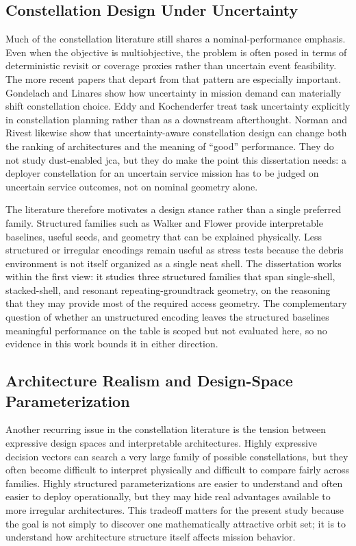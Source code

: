 \subsection{Constellation Design Under Uncertainty}
Much of the constellation literature still shares a nominal-performance emphasis. Even when the objective is multiobjective, the problem is often posed in terms of deterministic revisit or coverage proxies rather than uncertain event feasibility. The more recent papers that depart from that pattern are especially important. Gondelach and Linares \cite{GondelachLinares2019} show how uncertainty in mission demand can materially shift constellation choice. Eddy and Kochenderfer \cite{EddyKochenderfer2019} treat task uncertainty explicitly in constellation planning rather than as a downstream afterthought. Norman and Rivest \cite{NormanRivest2024} likewise show that uncertainty-aware constellation design can change both the ranking of architectures and the meaning of ``good'' performance. They do not study dust-enabled \gls{jca}, but they do make the point this dissertation needs: a deployer constellation for an uncertain service mission has to be judged on uncertain service outcomes, not on nominal geometry alone.

The literature therefore motivates a design stance rather than a single preferred family. Structured families such as Walker and Flower provide interpretable baselines, useful seeds, and geometry that can be explained physically. Less structured or irregular encodings remain useful as stress tests because the debris environment is not itself organized as a single neat shell. The dissertation works within the first view: it studies three structured families that span single-shell, stacked-shell, and resonant repeating-groundtrack geometry, on the reasoning that they may provide most of the required access geometry. The complementary question of whether an unstructured encoding leaves the structured baselines meaningful performance on the table is scoped but not evaluated here, so no evidence in this work bounds it in either direction.

\subsection{Architecture Realism and Design-Space Parameterization}
Another recurring issue in the constellation literature is the tension between expressive design spaces and interpretable architectures. Highly expressive decision vectors can search a very large family of possible constellations, but they often become difficult to interpret physically and difficult to compare fairly across families. Highly structured parameterizations are easier to understand and often easier to deploy operationally, but they may hide real advantages available to more irregular architectures. This tradeoff matters for the present study because the goal is not simply to discover one mathematically attractive orbit set; it is to understand how architecture structure itself affects mission behavior.

